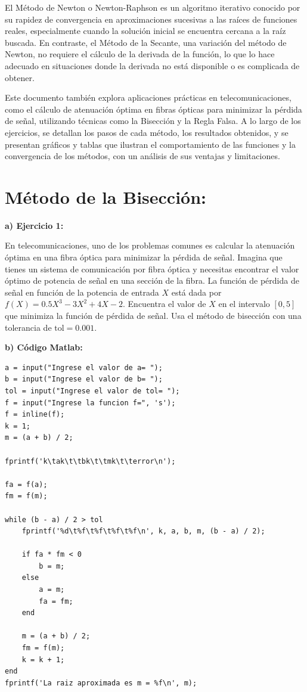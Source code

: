 \documentclass[12pt,a4paper,twoside]{article}  %
\begin{document}
El Método de Newton o Newton-Raphson es un algoritmo iterativo conocido por su rapidez de convergencia en aproximaciones sucesivas a las raíces de funciones reales, especialmente cuando la solución inicial se encuentra cercana a la raíz buscada. En contraste, el Método de la Secante, una variación del método de Newton, no requiere el cálculo de la derivada de la función, lo que lo hace adecuado en situaciones donde la derivada no está disponible o es complicada de obtener.

Este documento también explora aplicaciones prácticas en telecomunicaciones, como el cálculo de atenuación óptima en fibras ópticas para minimizar la pérdida de señal, utilizando técnicas como la Bisección y la Regla Falsa. A lo largo de los ejercicios, se detallan los pasos de cada método, los resultados obtenidos, y se presentan gráficos y tablas que ilustran el comportamiento de las funciones y la convergencia de los métodos, con un análisis de sus ventajas y limitaciones.



\newpage

\section{Método de la Bisección:}

\textbf{a) Ejercicio 1: }

En telecomunicaciones, uno de los problemas comunes es calcular la atenuación óptima en una fibra óptica para minimizar la pérdida de señal. Imagina que tienes un sistema de comunicación por fibra óptica y necesitas encontrar el valor óptimo de potencia de señal en una sección de la fibra. La función de pérdida de señal en función de la potencia de entrada \(X\) está dada por \(f(X) = 0.5X^3 - 3X^2 + 4X - 2\). Encuentra el valor de \(X\) en el intervalo \([0, 5]\) que minimiza la función de pérdida de señal. Usa el método de bisección con una tolerancia de \( \text{tol} = 0.001 \).


\textbf{b) Código Matlab:}

\begin{lstlisting}
a = input("Ingrese el valor de a= ");
b = input("Ingrese el valor de b= ");
tol = input("Ingrese el valor de tol= ");
f = input("Ingrese la funcion f=", 's');
f = inline(f);  
k = 1;          
m = (a + b) / 2; 

fprintf('k\tak\t\tbk\t\tmk\t\terror\n');

fa = f(a);
fm = f(m);

while (b - a) / 2 > tol
    fprintf('%d\t%f\t%f\t%f\t%f\n', k, a, b, m, (b - a) / 2);
    
    if fa * fm < 0  
        b = m;      
    else
        a = m;      
        fa = fm;    
    end
    
    m = (a + b) / 2;
    fm = f(m); 
    k = k + 1;  
end
fprintf('La raiz aproximada es m = %f\n', m);

\end{lstlisting}
\end{document}
